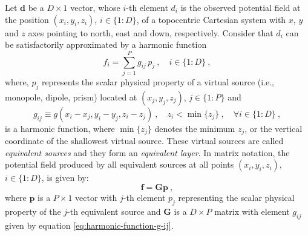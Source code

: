 \documentclass[utf8]{FrontiersinHarvard} %
\begin{document}
	Let $\mathbf{d}$ be a $D \times 1$ vector, whose $i$-th element $d_{i}$ is the observed potential
	field at the position $(x_{i}, y_{i}, z_{i})$, $i \in \{1:D\}$, of a topocentric Cartesian system with
	$x$, $y$ and $z$ axes pointing to north, east and down, respectively.
	Consider that $d_{i}$ can be satisfactorily approximated by a harmonic function
	\begin{equation}
		f_{i} = \sum\limits_{j = 1}^{P} g_{ij} \, p_{j} \: ,
		\quad i \in \{1:D\} \: ,
		\label{eq:predicted-data-f-i}
	\end{equation}
	where, $p_{j}$ represents the scalar physical property of a virtual source (i.e., monopole, dipole, prism) located
	at $(x_{j}, y_{j}, z_{j})$, $j \in \{1:P\}$ and 
	\begin{equation}
		g_{ij} \equiv g(x_{i} - x_{j}, y_{i} - y_{j}, z_{i} - z_{j}) \: ,
		\quad z_{i} < \min\{z_{j}\} \: , \quad \forall i \in \{1:D\} \: ,
		\label{eq:harmonic-function-g-ij}
	\end{equation}
	is a harmonic function, where $\min\{z_{j}\}$ denotes the minimum $z_{j}$, or the vertical coordinate of the 
	shallowest virtual source.
	These virtual sources are called \textit{equivalent sources} and they form an \textit{equivalent layer}.
	In matrix notation, the potential field produced by all equivalent sources at all points 
	$(x_{i}, y_{i}, z_{i})$, $i \in \{1:D\}$, is given by:
	\begin{equation}
		\mathbf{f} = \mathbf{G} \mathbf{p} \: ,
		\label{eq:predicted-data-vector}
	\end{equation}
	where $\mathbf{p}$ is a $P \times 1$ vector with $j$-th element $p_{j}$ representing the scalar physical property
	of the $j$-th equivalent source 
	and $\mathbf{G}$ is a $D \times P$ matrix with element $g_{ij}$ given by equation \ref{eq:harmonic-function-g-ij}. 
	
\end{document}
